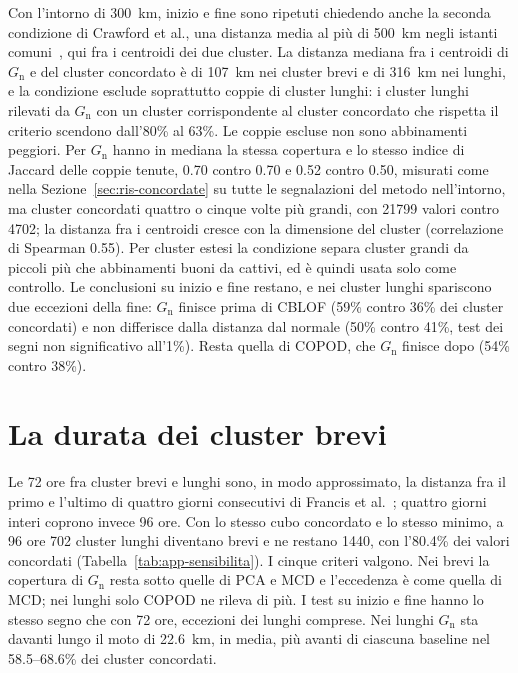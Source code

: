 Con l'intorno di 300~km, inizio e fine sono ripetuti chiedendo anche la seconda condizione di Crawford et al., una distanza media al più di 500~km negli istanti comuni~\cite{crawford2021cyclones}, qui fra i centroidi dei due cluster. La distanza mediana fra i centroidi di $G_{\mathrm{n}}$ e del cluster concordato è di 107~km nei cluster brevi e di 316~km nei lunghi, e la condizione esclude soprattutto coppie di cluster lunghi: i cluster lunghi rilevati da $G_{\mathrm{n}}$ con un cluster corrispondente al cluster concordato che rispetta il criterio scendono dall'80\% al 63\%. Le coppie escluse non sono abbinamenti peggiori. Per $G_{\mathrm{n}}$ hanno in mediana la stessa copertura e lo stesso indice di Jaccard delle coppie tenute, 0.70 contro 0.70 e 0.52 contro 0.50, misurati come nella Sezione~\ref{sec:ris-concordate} su tutte le segnalazioni del metodo nell'intorno, ma cluster concordati quattro o cinque volte più grandi, con 21799 valori contro 4702; la distanza fra i centroidi cresce con la dimensione del cluster (correlazione di Spearman 0.55). Per cluster estesi la condizione separa cluster grandi da piccoli più che abbinamenti buoni da cattivi, ed è quindi usata solo come controllo. Le conclusioni su inizio e fine restano, e nei cluster lunghi spariscono due eccezioni della fine: $G_{\mathrm{n}}$ finisce prima di CBLOF (59\% contro 36\% dei cluster concordati) e non differisce dalla distanza dal normale (50\% contro 41\%, test dei segni non significativo all'1\%). Resta quella di COPOD, che $G_{\mathrm{n}}$ finisce dopo (54\% contro 38\%).

\section{La durata dei cluster brevi}
\label{app:sens-durata}

Le 72 ore fra cluster brevi e lunghi sono, in modo approssimato, la distanza fra il primo e l'ultimo di quattro giorni consecutivi di Francis et al.~\cite{francis2018regimes,francis2020asia}; quattro giorni interi coprono invece 96 ore. Con lo stesso cubo concordato e lo stesso minimo, a 96 ore 702 cluster lunghi diventano brevi e ne restano 1440, con l'80.4\% dei valori concordati (Tabella~\ref{tab:app-sensibilita}). I cinque criteri valgono. Nei brevi la copertura di $G_{\mathrm{n}}$ resta sotto quelle di PCA e MCD e l'eccedenza è come quella di MCD; nei lunghi solo COPOD ne rileva di più. I test su inizio e fine hanno lo stesso segno che con 72 ore, eccezioni dei lunghi comprese. Nei lunghi $G_{\mathrm{n}}$ sta davanti lungo il moto di 22.6~km, in media, più avanti di ciascuna baseline nel 58.5--68.6\% dei cluster concordati.
